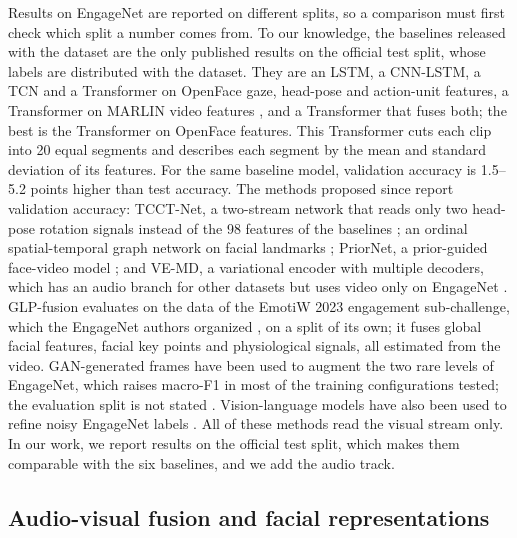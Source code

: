 \documentclass[pdflatex,iicol,sn-basic]{sn-jnl}
\begin{document}
Results on EngageNet are reported on different splits, so a comparison must first check which split a number comes from. To our knowledge, the baselines released with the dataset \citep{singh2023engagenet} are the only published results on the official test split, whose labels are distributed with the dataset. They are an LSTM, a CNN-LSTM, a TCN and a Transformer on OpenFace gaze, head-pose and action-unit features, a Transformer on MARLIN video features \citep{cai2023marlin}, and a Transformer that fuses both; the best is the Transformer on OpenFace features. This Transformer cuts each clip into 20 equal segments and describes each segment by the mean and standard deviation of its features. For the same baseline model, validation accuracy is 1.5--5.2 points higher than test accuracy. The methods proposed since report validation accuracy: TCCT-Net, a two-stream network that reads only two head-pose rotation signals instead of the 98 features of the baselines \citep{vedernikov2024tcct}; an ordinal spatial-temporal graph network on facial landmarks \citep{abedi2024stgcn}; PriorNet, a prior-guided face-video model \citep{vedernikov2026priornet}; and VE-MD, a variational encoder with multiple decoders, which has an audio branch for other datasets but uses video only on EngageNet \citep{augusma2026vemd}. GLP-fusion \citep{qin2026glpfusion} evaluates on the data of the EmotiW 2023 engagement sub-challenge, which the EngageNet authors organized \citep{dhall2023emotiw}, on a split of its own; it fuses global facial features, facial key points and physiological signals, all estimated from the video. GAN-generated frames have been used to augment the two rare levels of EngageNet, which raises macro-F1 in most of the training configurations tested; the evaluation split is not stated \citep{yulius2025gan}. Vision-language models have also been used to refine noisy EngageNet labels \citep{vedernikov2025vlmnoise}. All of these methods read the visual stream only. In our work, we report results on the official test split, which makes them comparable with the six baselines, and we add the audio track.

\subsection{Audio-visual fusion and facial representations}\label{sec:rw_av}
\end{document}

